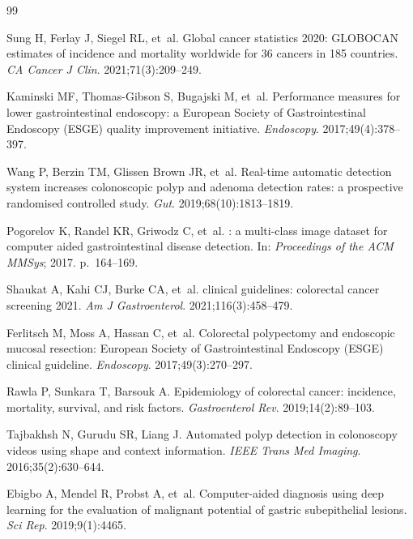 \documentclass[10pt,a4paper,twocolumn]{article}
\begin{document}
\begin{thebibliography}{99}

Sung H, Ferlay J, Siegel RL, et~al.
\newblock Global cancer statistics 2020: {GLOBOCAN} estimates of incidence and
  mortality worldwide for 36 cancers in 185 countries.
\newblock \emph{CA Cancer J Clin}. 2021;71(3):209--249.

Kaminski MF, Thomas-Gibson S, Bugajski M, et~al.
\newblock Performance measures for lower gastrointestinal endoscopy: a
  {European Society of Gastrointestinal Endoscopy (ESGE)} quality improvement
  initiative.
\newblock \emph{Endoscopy}. 2017;49(4):378--397.

Wang P, Berzin TM, Glissen Brown JR, et~al.
\newblock Real-time automatic detection system increases colonoscopic polyp and
  adenoma detection rates: a prospective randomised controlled study.
\newblock \emph{Gut}. 2019;68(10):1813--1819.

Pogorelov K, Randel KR, Griwodz C, et~al.
: a multi-class image dataset for computer aided
  gastrointestinal disease detection.
\newblock In: \emph{Proceedings of the ACM MMSys}; 2017. p.~164--169.

Shaukat A, Kahi CJ, Burke CA, et~al.
 clinical guidelines: colorectal cancer screening 2021.
\newblock \emph{Am J Gastroenterol}. 2021;116(3):458--479.

Ferlitsch M, Moss A, Hassan C, et~al.
\newblock Colorectal polypectomy and endoscopic mucosal resection: {European
  Society of Gastrointestinal Endoscopy (ESGE)} clinical guideline.
\newblock \emph{Endoscopy}. 2017;49(3):270--297.

Rawla P, Sunkara T, Barsouk A.
\newblock Epidemiology of colorectal cancer: incidence, mortality, survival,
  and risk factors.
\newblock \emph{Gastroenterol Rev}. 2019;14(2):89--103.

Tajbakhsh N, Gurudu SR, Liang J.
\newblock Automated polyp detection in colonoscopy videos using shape and
  context information.
\newblock \emph{IEEE Trans Med Imaging}. 2016;35(2):630--644.

Ebigbo A, Mendel R, Probst A, et~al.
\newblock Computer-aided diagnosis using deep learning for the evaluation of
  malignant potential of gastric subepithelial lesions.
\newblock \emph{Sci Rep}. 2019;9(1):4465.


\end{thebibliography}
\end{document}

